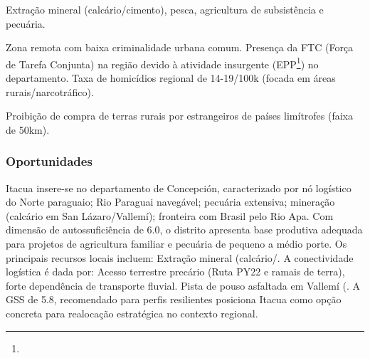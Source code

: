 \begin{description}[style=nextline,leftmargin=0.5cm,font=\bfseries]
\item[Recursos Locais]  Extração mineral (calcário/\allowbreak \allowbreak cimento), pesca, agricultura de subsistência e pecuária.
\item[Segurança]  Zona remota com baixa criminalidade urbana comum. Presença da FTC (Força de Tarefa Conjunta) na região devido à atividade insurgente (EPP\footnote{\fineEPP}) no departamento. Taxa de homicídios regional de 14-19/\allowbreak \allowbreak 100k (focada em áreas rurais/\allowbreak \allowbreak narcotráfico).
\item[Leis Local: Município de criação recente (2021). Restrição de Fronteira (Lei 2532/\allowbreak \allowbreak 05)]  Proibição de compra de terras rurais por estrangeiros de países limítrofes (faixa de 50km).
\end{description}
\newpage

\subsubsection*{Oportunidades}\label{oport-itacua-0114}
Itacua insere-se no departamento de Concepción, caracterizado por nó logístico do Norte paraguaio; Rio Paraguai navegável; pecuária extensiva; mineração (calcário em San Lázaro/Vallemí); fronteira com Brasil pelo Rio Apa. Com dimensão de autossuficiência de 6.0, o distrito apresenta base produtiva adequada para projetos de agricultura familiar e pecuária de pequeno a médio porte. Os principais recursos locais incluem: Extração mineral (calcário/. A conectividade logística é dada por: Acesso terrestre precário (Ruta PY22 e ramais de terra), forte dependência de transporte fluvial. Pista de pouso asfaltada em Vallemí (. A GSS de 5.8, recomendado para perfis resilientes posiciona Itacua como opção concreta para realocação estratégica no contexto regional.

